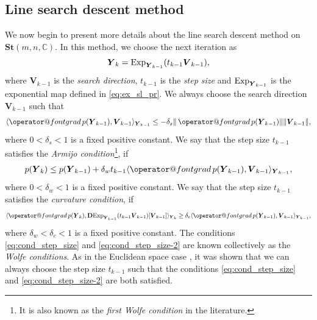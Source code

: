 \documentclass[final,onefignum,onetabnum]{siamart190516}
\makeatletter
\newcommand{\matr}[1]{\boldsymbol{#1}}
\newcommand{\ProjGrad}[2]{\mathop{{\operator@font grad} }#1(#2)}
\newcommand{\CC}{\mathbb{C}}
\newcommand{\St}{\mathbf{St}}
\makeatother
\begin{document}
\subsection{Line search descent method}\label{subsec:line_seach}
We now begin to present more details about the line search descent method \cite{absil2005convergence,absil2009optimization,nocedal2006numerical,ring2012optimization,sato2015new} on $\St(m,n,\CC)$.  In this method, we choose the next iteration as 
\begin{equation}\label{eq:U_k_update}
\matr{Y}_{k} ={\rm Exp}_{\matr{Y}_{k-1}}(t_{k-1}\matr{V}_{k-1}),
\end{equation}
where $\matr{V}_{k-1}$ is the \emph{search direction}, $t_{k-1}$ is the \emph{step size} and ${\rm Exp}_{\matr{Y}_{k-1}}$ is the exponential map defined in \cref{eq:ex_sl_pr}. We always choose the search direction  $\matr{V}_{k-1}$ such that 
\begin{equation}\label{eq:cond_driect}
\langle\ProjGrad{p}{\matr{Y}_{k-1}},\matr{V}_{k-1}\rangle_{\matr{Y}_{k-1}}\leq -\delta_{s} \|\ProjGrad{p}{\matr{Y}_{k-1}}\|\|\matr{V}_{k-1}\|,
\end{equation}
where $0<\delta_{s}<1$ is a fixed positive constant. 
 We say that the step size $t_{k-1}$ satisfies the \emph{Armijo condition}\footnote{It is also known as the \emph{first
Wolfe condition} in the literature.}, if 
\begin{align}\label{eq:cond_step_size}
p(\matr{Y}_{k})\leq p(\matr{Y}_{k-1}) + \delta_{w}t_{k-1}\langle\ProjGrad{p}{\matr{Y}_{k-1}},\matr{V}_{k-1}\rangle_{\matr{Y}_{k-1}},
\end{align}
where $0<\delta_{w}<1$ is a fixed positive constant. We say that the step size $t_{k-1}$ satisfies the \emph{curvature condition}, if \begin{align}\label{eq:cond_step_size-2}{\small 
\langle\ProjGrad{p}{\matr{Y}_{k}},\mathbf{D}{\rm Exp}_{\matr{Y}_{k-1}}(t_{k-1}\matr{V}_{k-1})[\matr{V}_{k-1}]\rangle_{\matr{Y}_{k}}\geq \delta_{c} \langle\ProjGrad{p}{\matr{Y}_{k-1}},\matr{V}_{k-1}\rangle_{\matr{Y}_{k-1}},}
\end{align}
where $\delta_{w}<\delta_{c}<1$ is a fixed positive constant. 
The conditions \cref{eq:cond_step_size} and \cref{eq:cond_step_size-2} are known collectively as the \emph{Wolfe conditions}. 
As in the Euclidean space case \cite[Lemma 3.1]{nocedal2006numerical}, it was shown \cite{ring2012optimization,sato2015new} that we can always choose the step size $t_{k-1}$ such that the conditions \cref{eq:cond_step_size} and \cref{eq:cond_step_size-2} are both satisfied. 
\end{document}
